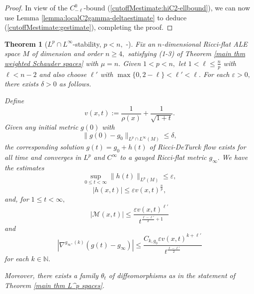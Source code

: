 \documentclass[12pt]{amsart}
\newcommand{\calM}{\mathcal{M}}
\newcommand{\N}{{\mathbb N}}
\renewcommand{\1}{{\mathbf 1}}
\newcommand{\eps}{{\varepsilon}}
\newtheorem{thm}{Theorem}[section]
\theoremstyle{others}
\numberwithin{equation}{section}
\begin{document}
\begin{proof}
In view of the $C^0_{-\ell}$-bound (\ref{cutoffMestimate:hiC2-ellbound}), we can now use Lemma \ref{lemma:localC2gamma-deltaestimate} to deduce (\ref{cutoffMestimate:gestimate}), completing the proof.
\end{proof}


    \begin{thm}[$L^p \cap L^\infty$-stability, $p < n,$ \cite{DeruelleKroncke20}-\cite{KronckePetersen20}]\label{thm:Lqstability}
        Fix an $n$-dimensional Ricci-flat ALE space $M$ of dimension and order $n \geq 4,$ satisfying (1-3) of %
        Theorem \ref{main thm weighted Schauder spaces} with $\mu = n.$ Given $1 < p < n,$ let $1 < \ell \leq \frac{n}{p}$ with $\ell < n-2$ and also choose $\ell'$ with $\max\{ 0, 2- \ell \} < \ell' < \ell.$ For each $\eps > 0,$ there exists $\delta > 0$ as follows.
        
Define
\begin{equation}\label{v(x,t)def}
v(x,t) := \frac{1}{\rho(x)} + \frac{1}{\sqrt{1 + t}}.
\end{equation}
Given any initial metric $g(0)$ with
        \begin{equation}\label{Lpstability:deltainitialbound}
        \| g(0) - g_0 \|_{L^p\cap L^\infty(M)} \leq \delta,
    \end{equation}
    the corresponding solution $g(t) = g_0 + h(t)$ of Ricci-DeTurck flow exists for all time and converges in $L^p$ and $C^\infty$ to a gauged Ricci-flat metric $g_\infty.$ We have the estimates
      \begin{equation}\label{Lpstability:hLpestimate}
        \sup_{0 \leq t < \infty} \| h(t) \|_{L^p(M)} \leq \eps,
    \end{equation}
          \begin{equation}\label{Lpstability:hpointwiseestimate}
       | h(x,t) | \leq \eps v(x,t)^{\frac{n}{p}},
    \end{equation}
    and, for $1 \leq t < \infty,$
        \begin{equation}\label{Lpstability:Mestimate}
        |\calM(x,t)| \leq \frac{\eps v(x,t)^{\ell'}}{ t^{\frac{\ell - \ell'}{2} + 1} }
    \end{equation}
    and
\begin{equation}\label{Lpstability:ginftyestimate}
        | \nabla^{g_\infty,(k)} \left( g(t) - g_\infty \right) | \leq \frac{ C_{k,g_0} \eps v(x,t)^{k + \ell'} }{ t^{\frac{\ell - \ell'}{2}} }
    \end{equation}
    for each $k \in \N.$
    
    Moreover, there exists a family $\theta_t$ of diffeomorphisms as in the statement of Theorem \ref{main thm L^p spaces}.
    \end{thm}
\end{document}
